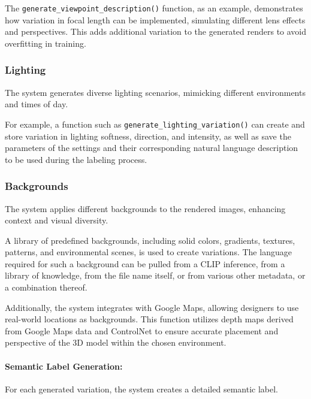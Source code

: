 \documentclass{article}
\begin{document}
The \texttt{generate\_viewpoint\_description()} function, as an example, demonstrates how variation in focal length can be implemented, simulating different lens effects and perspectives. This adds additional variation to the generated renders to avoid overfitting in training.


\subsubsection{Lighting} 

The system generates diverse lighting scenarios, mimicking different environments and times of day.

For example, a function such as \texttt{generate\_lighting\_variation()} can create and store variation in lighting softness, direction, and intensity, as well as save the parameters of the settings and their corresponding natural language description to be used during the labeling process. 


\subsubsection{Backgrounds}

The system applies different backgrounds to the rendered images, enhancing context and visual diversity.

A library of predefined backgrounds, including solid colors, gradients, textures, patterns, and environmental scenes, is used to create variations. The language required for such a background can be pulled from a CLIP inference, from a library of knowledge, from the file name itself, or from various other metadata, or a combination thereof.

Additionally, the system integrates with Google Maps, allowing designers to use real-world locations as backgrounds. This function utilizes depth maps derived from Google Maps data and ControlNet to ensure accurate placement and perspective of the 3D model within the chosen environment. 

\paragraph{Semantic Label Generation:} For each generated variation, the system creates a detailed semantic label.
\end{document}

